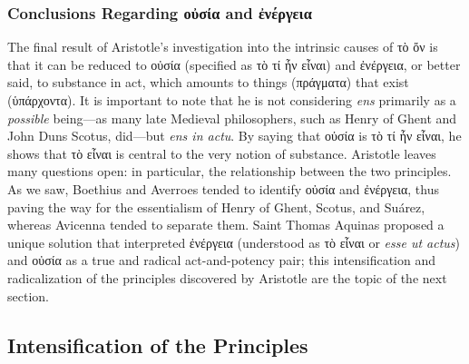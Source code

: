 \subsubsection{Conclusions Regarding οὐσία and ἐνέργεια}

The final result of Aristotle’s investigation into the intrinsic causes of τὸ ὄν is that it can be reduced to οὐσία (specified as τὸ τί ἦν εἶναι) and ἐνέργεια, or better said, to substance in act, which amounts to things (πράγματα) that exist (ὑπάρχοντα). It is important to note that he is not considering \emph{ens} primarily as a \emph{possible} being—as many late Medieval philosophers, such as Henry of Ghent and John Duns Scotus, did—but \emph{ens in actu}. By saying that οὐσία is τὸ τί ἦν εἶναι, he shows that τὸ εἶναι is central to the very notion of substance. Aristotle leaves many questions open: in particular, the relationship between the two principles. As we saw, Boethius and Averroes tended to identify οὐσία and ἐνέργεια, thus paving the way for the essentialism of Henry of Ghent, Scotus, and Suárez, whereas Avicenna tended to separate them. Saint Thomas Aquinas proposed a unique solution that interpreted ἐνέργεια (understood as τὸ εἶναι or \emph{esse ut actus}) and οὐσία as a true and radical act-and-potency pair; this intensification and radicalization of the principles discovered by Aristotle are the topic of the next section.

\subsection{Intensification of the Principles}

